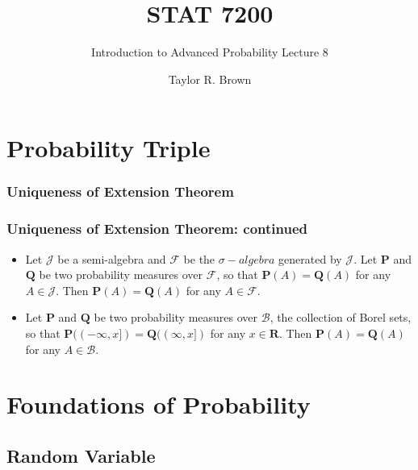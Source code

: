 \documentclass[handout]{beamer}
\title{STAT 7200}
\subtitle{Introduction to Advanced Probability \newline Lecture 8}
\author{Taylor R. Brown}
\institute{}
\date{}
\begin{document}
\frame{\titlepage}

\section[Outline]{}



\section{Probability Triple}
\subsubsection{Uniqueness of Extension Theorem}

\frame
{
  \frametitle{Uniqueness of Extension Theorem: continued}

   \begin{itemize}
     
    
            
                   
\item<1->[]    
\begin{Corollary} 
Let $\mathcal{J}$ be a semi-algebra and $\mathcal{F}$ be the $\sigma-algebra$ generated by  $\mathcal{J}$. Let $\mathbf{P}$ and $\mathbf{Q}$ be two probability measures over $\mathcal{F}$, so that $\mathbf{P}(A)=\mathbf{Q} (A)$ for any $A\in\mathcal{J}$. Then $\mathbf{P}(A)=\mathbf{Q} (A)$ for any $A\in\mathcal{F}$. 
\end{Corollary}    
                 
\item<2->[]    
\begin{Corollary} Let $\mathbf{P}$ and $\mathbf{Q}$ be two probability measures over $\mathcal{B}$,  the collection of Borel sets, so that $\mathbf{P}((-\infty, x])=\mathbf{Q} ((\infty,x])$ for any $x\in \mathbf{R}$. Then $\mathbf{P}(A)=\mathbf{Q} (A)$ for any $A\in\mathcal{B}$. 
\end{Corollary}    
\end{itemize}

}


\section{Foundations of Probability}

\subsection{Random Variable}
\end{document}
